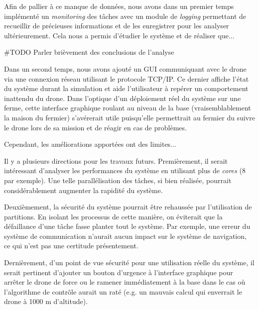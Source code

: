 \documentclass[journal]{IEEEtran}
\begin{document}
Afin de pallier à ce manque de données, nous avons dans un premier temps implémenté un \textit{monitoring} des tâches avec un module de \textit{logging} permettant de recueillir de précieuses informations et de les enregistrer pour les analyser ultérieurement. Cela nous a permis d'étudier le système et de réaliser que...

\#TODO Parler brièvement des conclusions de l'analyse

Dans un second temps, nous avons ajouté un GUI communiquant avec le drone via une connexion réseau utilisant le protocole TCP/IP. Ce dernier affiche l'état du système durant la simulation et aide l'utilisateur à repérer un comportement inattendu du drone. Dans l'optique d'un déploiement réel du système sur une ferme, cette interface graphique roulant au niveau de la base (vraisemblablement la maison du fermier) s'avérerait utile puisqu'elle permettrait au fermier du suivre le drone lors de sa mission et de réagir en cas de problèmes.

\vspace{2mm}

Cependant, les améliorations apportées ont des limites...


\vspace{2mm}
Il y a plusieurs directions pour les travaux futurs. Premièrement, il serait intéressant d'analyser les performances du système en utilisant plus de \textit{cores} (8 par exemple). Une telle parallélisation des tâches, si bien réalisée, pourrait considérablement augmenter la rapidité du système.

Deuxièmement, la sécurité du système pourrait être rehaussée par l'utilisation de partitions. En isolant les processus de cette manière, on éviterait que la défaillance d'une tâche fasse planter tout le système. Par exemple, une erreur du système de communication n'aurait aucun impact sur le système de navigation, ce qui n'est pas une certitude présentement.

Dernièrement, d'un point de vue sécurité pour une utilisation réelle du système, il serait pertinent d'ajouter un bouton d'urgence à l'interface graphique pour arrêter le drone de force ou le ramener immédiatement à la base dans le cas où l'algorithme de contrôle aurait un raté (e.g. un mauvais calcul qui enverrait le drone à 1000 m d'altitude). 







\end{document}
